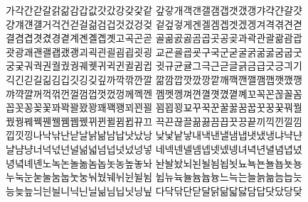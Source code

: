 



%



%



가각간갇갈갉갊감갑값갓갔강갖갗같 갚갛개객갠갤갬갭갯갰갱갸갹갼걀걋 \\

걍걔걘걜거걱건걷걸걺검겁것겄겅겆 겉겊겋게겐겔겜겝겟겠겡겨격겪견겯 \\

결겸겹겻겼경곁계곈곌곕곗고곡곤곧 골곪곬곯곰곱곳공곶과곽관괄괆괌괍 \\

괏광괘괜괠괩괬괭괴괵괸괼굄굅굇굉 교굔굘굡굣구국군굳굴굵굶굻굼굽굿 \\

궁궂궈궉권궐궜궝궤궷귀귁귄귈귐귑 귓규균귤그극근귿글긁금급긋긍긔기 \\

긱긴긷길긺김깁깃깅깆깊까깍깎깐깔 깖깜깝깟깠깡깥깨깩깬깰깸깹깻깼깽 \\

꺄꺅꺌꺼꺽꺾껀껄껌껍껏껐껑께껙껜 껨껫껭껴껸껼꼇꼈꼍꼐꼬꼭꼰꼲꼴꼼 \\

꼽꼿꽁꽂꽃꽈꽉꽐꽜꽝꽤꽥꽹꾀꾄꾈 꾐꾑꾕꾜꾸꾹꾼꿀꿇꿈꿉꿋꿍꿎꿔꿜 \\



꿨꿩꿰꿱꿴꿸뀀뀁뀄뀌뀐뀔뀜뀝뀨끄 끅끈끊끌끎끓끔끕끗끙끝끼끽낀낄낌 \\

낍낏낑나낙낚난낟날낡낢남납낫났낭 낮낯낱낳내낵낸낼냄냅냇냈냉냐냑냔 \\

냘냠냥너넉넋넌널넒넓넘넙넛넜넝넣 네넥넨넬넴넵넷넸넹녀녁년녈념녑녔 \\

녕녘녜녠노녹논놀놂놈놉놋농높놓놔 놘놜놨뇌뇐뇔뇜뇝뇟뇨뇩뇬뇰뇹뇻뇽 \\

누눅눈눋눌눔눕눗눙눠눴눼뉘뉜뉠뉨 뉩뉴뉵뉼늄늅늉느늑는늘늙늚늠늡늣 \\

능늦늪늬늰늴니닉닌닐닒님닙닛닝닢 다닥닦단닫달닭닮닯닳담답닷닸당닺 \\

